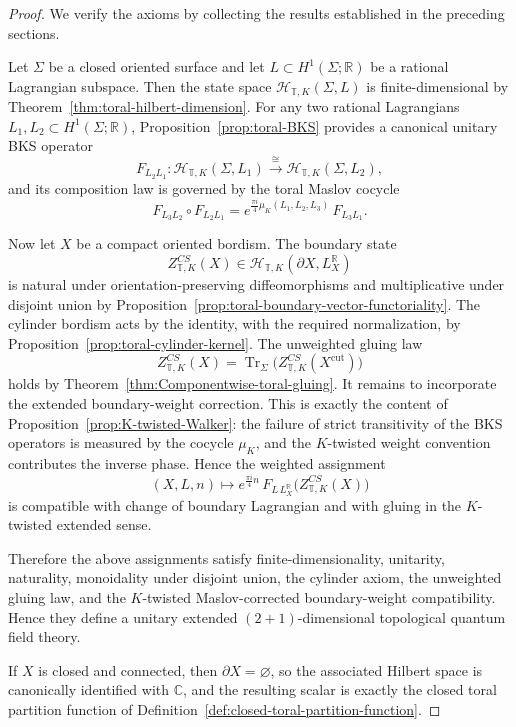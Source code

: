 \documentclass[12pt]{amsart}
\numberwithin{equation}{section}
\begin{document}
\begin{proof}
We verify the axioms by collecting the results established in the preceding sections.

Let $\Sigma$ be a closed oriented surface and let
$L\subset H^1(\Sigma;\mathbb R)$ be a rational Lagrangian subspace.
Then the state space $\mathcal H_{\mathbb T,K}(\Sigma,L)$ is finite-dimensional by
Theorem~\ref{thm:toral-hilbert-dimension}. For any two rational Lagrangians
$L_1,L_2\subset H^1(\Sigma;\mathbb R)$, Proposition~\ref{prop:toral-BKS}
provides a canonical unitary BKS operator
\[
F_{L_2L_1}\colon
\mathcal H_{\mathbb T,K}(\Sigma,L_1)\xrightarrow{\ \cong\ }
\mathcal H_{\mathbb T,K}(\Sigma,L_2),
\]
and its composition law is governed by the toral Maslov cocycle
\[
F_{L_3L_2}\circ F_{L_2L_1}
=
e^{\frac{\pi i}{4}\mu_K(L_1,L_2,L_3)}\,F_{L_3L_1}.
\]

Now let $X$ be a compact oriented bordism. The boundary state
\[
Z^{CS}_{\mathbb T,K}(X)\in
\mathcal H_{\mathbb T,K}(\partial X,L_X^{\mathbb R})
\]
is natural under orientation-preserving diffeomorphisms and multiplicative under
disjoint union by
Proposition~\ref{prop:toral-boundary-vector-functoriality}.
The cylinder bordism acts by the identity, with the required normalization, by
Proposition~\ref{prop:toral-cylinder-kernel}.
The unweighted gluing law
\[
Z^{CS}_{\mathbb T,K}(X)
=
\operatorname{Tr}_{\Sigma}\!\bigl(Z^{CS}_{\mathbb T,K}(X^{\mathrm{cut}})\bigr)
\]
holds by Theorem~\ref{thm:Componentwise-toral-gluing}. It remains to incorporate the extended boundary-weight correction.
This is exactly the content of Proposition~\ref{prop:K-twisted-Walker}:
the failure of strict transitivity of the BKS operators is measured by the cocycle
$\mu_K$, and the \(K\)-twisted weight convention contributes the inverse phase.
Hence the weighted assignment
\[
(X,L,n)\longmapsto
e^{\frac{\pi i}{4}n}\,
F_{L\,L_X^{\mathbb R}}\!\bigl(Z^{CS}_{\mathbb T,K}(X)\bigr)
\]
is compatible with change of boundary Lagrangian and with gluing in the
\(K\)-twisted extended sense.

Therefore the above assignments satisfy finite-dimensionality, unitarity,
naturality, monoidality under disjoint union, the cylinder axiom, the unweighted
gluing law, and the \(K\)-twisted Maslov-corrected boundary-weight compatibility.
Hence they define a unitary  extended
\((2+1)\)-dimensional topological quantum field theory.

If $X$ is closed and connected, then $\partial X=\varnothing$, so the associated
Hilbert space is canonically identified with $\mathbb C$, and the resulting scalar
is exactly the closed toral partition function of
Definition~\ref{def:closed-toral-partition-function}.
\end{proof}
\end{document}
